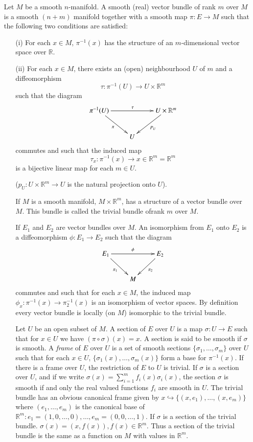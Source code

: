 Let $M$ be a smooth $n$-manifold. A smooth (real) vector bundle of rank $m$ over $M$ is a smooth $(n+m)$ manifold together with a smooth map $\pi:E\to M$ such that the following two conditions are satisfied: 
\begin{itemize}
\item[(i)] For each $x\in M$, $\pi^{-1}(x)$ has the structure of an $m$-dimensional vector space over $\mathbb{R}$.

\item[(ii)] For each $x\in M$, there exists an (open) neighbourhood $U$ of $m$ and a diffeomorphism
$$
\tau : \pi^{-1}(U)\to U\times \mathbb{R}^{m}
$$
such that the diagram
\[
\xymatrix{
\pi^{-1}(U)\ar[dr]_{\pi}\ar[rr]^{\tau} & & U\times \mathbb{R}^{m}\ar[dl]^{P_{U}}\\
& U &
}
\]
commutes and such that the induced map
$$
\tau_{x}:\pi^{-1}(x)\to x\in \mathbb{R}^{m}=\mathbb{R}^{m}
$$
is a bijective linear map for each $m\in U$.

($p_{U}:U\times \mathbb{R}^{m}\to U$ is the natural projection onto $U$).

If $M$ is a smooth manifold, $M\times \mathbb{R}^{m}$, has a structure of a vector bundle over $M$. This bundle is called the trivial bundle of\pageoriginale rank $m$ over $M$.

If $E_{1}$ and $E_{2}$ are vector bundles over $M$. An isomorphism from $E_{1}$ onto $E_{2}$ is a diffeomorphism $\phi:E_{1}\to E_{2}$ such that the diagram
\[
\xymatrix{
E_{1}\ar[dr]_{\pi_{1}}\ar[rr]^{\phi} & & E_{2}\ar[dl]^{\pi_{2}}\\
 & M &
}
\]
commutes and such that for each $x\in M$, the induced map $\phi_{x}:\pi^{-1}(x)\to \pi^{-1}_{2}(x)$ is an isomorphism of vector spaces. By definition every vector bundle is locally (on $M$) isomorphic to the trivial bundle.

Let $U$ be an open subset of $M$. A section of $E$ over $U$ is a map $\sigma:U\to E$ such that for $x\in U$ we have $(\pi\circ\sigma)(x)=x$. A section is said to be smooth if $\sigma$ is smooth. A {\em frame} of $E$ over $U$ is a set of smooth sections $\{\sigma_{1},\ldots,\sigma_{m}\}$ over $U$ such that for each $x\in U$, $\{\sigma_{1}(x),\ldots,\sigma_{m}(x)\}$ form a base for $\pi^{-1}(x)$. If there is a frame over $U$, the restriction of $E$ to $U$ is trivial. If $\sigma$ is a section over $U$, and if we write $\sigma(x)=\sum\limits^{m}_{i=1}f_{i}(x)\sigma_{i}(x)$, the section $\sigma$ is smooth if and only the real valued functions $f_{i}$ are smooth in $U$. The trivial bundle has an obvious canonical frame given by $x\hookrightarrow \{(x,e_{1}),\ldots,(x,e_{m})\}$ where $(e_{1},\ldots,e_{m})$ is the canonical base of $\mathbb{R}^{m} : e_{1}=(1,0,\ldots,0),\ldots,e_{m}=(0,0,\ldots,1)$. If $\sigma$ is a section of the trivial bundle. $\sigma(x)=(x,f(x)),f(x)\in \mathbb{R}^{m}$. Thus a section of the trivial bundle is the same as a function on $M$ with values in $\mathbb{R}^{m}$. 
\end{itemize}

